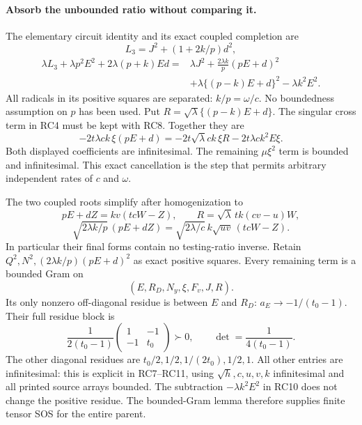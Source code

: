 \paragraph{Absorb the unbounded ratio without comparing it.}
The elementary circuit identity and its exact coupled completion are
\[
 L_3=J^2+(1+2k/p)d^2,
\]
\[
 \begin{split}
 \lambda L_3+\lambda p^2E^2+2\lambda(p+k)Ed
 ={}&\lambda J^2+\frac{2\lambda k}{p}(pE+d)^2\\
 &+\lambda\{(p-k)E+d\}^2-\lambda k^2E^2.
 \end{split}                                                    \tag{RC10}
\]
All radicals in its positive squares are separated: $k/p=\omega/c$.
No boundedness assumption on $p$ has been used. Put
$R=\sqrt\lambda\{(p-k)E+d\}$.
The singular cross term in RC4 must be kept with RC8. Together they
are
\[
 -2t\lambda ck\,\xi(pE+d)
 =-2t\sqrt\lambda ck\,\xi R-2t\lambda ck^2E\xi.
 \tag{RC11}
\]
Both displayed coefficients are infinitesimal. The remaining
$\mu\xi^2$ term is bounded and infinitesimal. This exact cancellation
is the step that permits arbitrary independent rates of $c$ and
$\omega$.

The two coupled roots simplify after homogenization to
\[
 pE+dZ=kv(tcW-Z),\qquad
 R=\sqrt\lambda\,tk(cv-u)W,
\]
\[
 \sqrt{2\lambda k/p}\,(pE+dZ)
       =\sqrt{2\lambda/c}\,k\sqrt{uv}\,(tcW-Z).
 \tag{RC13}
\]
In particular their final forms contain no testing-ratio inverse.
Retain $Q^2,N^2,(2\lambda k/p)(pE+d)^2$ as exact positive squares.
Every remaining term is a bounded Gram on
\[
              (E,R_D,N_y,\xi,F_v,J,R).
\]
Its only nonzero off-diagonal residue is between $E$ and $R_D$:
$a_E\to-1/(t_0-1)$. Their full residue block is
\[
 \frac1{2(t_0-1)}
 \begin{pmatrix}1&-1\\-1&t_0\end{pmatrix}\succ0,
 \qquad \det=\frac1{4(t_0-1)}.
 \tag{RC12}
\]
The other diagonal residues are $t_0/2,1/2,1/(2t_0),1/2,1$.
All other entries are infinitesimal: this is explicit in RC7--RC11,
using $\sqrt h,c,u,v,k$ infinitesimal and all printed source arrays
bounded. The subtraction $-\lambda k^2E^2$ in RC10 does not change
the positive residue. The bounded-Gram lemma therefore supplies
finite tensor SOS for the entire parent.

